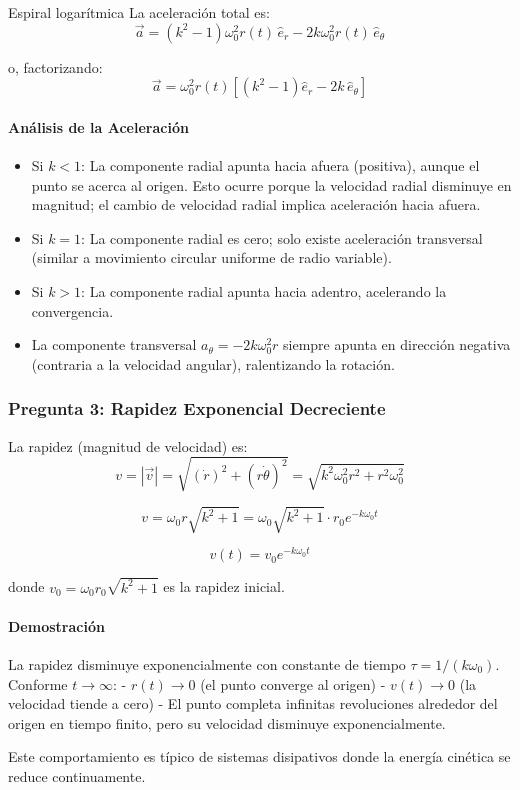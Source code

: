 \begin{solucion}{Espiral logarítmica}
La aceleración total es:
\begin{equation}
\boxed{\vec{a} = (k^2 - 1) \omega_0^2 r(t) \, \hat{e}_r - 2k\omega_0^2 r(t) \, \hat{e}_\theta}
\end{equation}

o, factorizando:
\begin{equation}
\vec{a} = \omega_0^2 r(t) \left[ (k^2 - 1) \hat{e}_r - 2k \, \hat{e}_\theta \right]
\end{equation}

\paragraph{Análisis de la Aceleración}

\begin{itemize}
    \item Si $k < 1$: La componente radial apunta hacia afuera (positiva), aunque el punto se acerca al origen. Esto ocurre porque la velocidad radial disminuye en magnitud; el cambio de velocidad radial implica aceleración hacia afuera.
    \item Si $k = 1$: La componente radial es cero; solo existe aceleración transversal (similar a movimiento circular uniforme de radio variable).
    \item Si $k > 1$: La componente radial apunta hacia adentro, acelerando la convergencia.
    \item La componente transversal $a_\theta = -2k\omega_0^2 r$ siempre apunta en dirección negativa (contraria a la velocidad angular), ralentizando la rotación.
\end{itemize}

\subsubsection*{Pregunta 3: Rapidez Exponencial Decreciente}

La rapidez (magnitud de velocidad) es:
$$v = |\vec{v}| = \sqrt{(\dot{r})^2 + (r\dot{\theta})^2} = \sqrt{k^2\omega_0^2 r^2 + r^2 \omega_0^2}$$

$$v = \omega_0 r \sqrt{k^2 + 1} = \omega_0 \sqrt{k^2 + 1} \cdot r_0 e^{-k\omega_0 t}$$

\begin{equation}
\boxed{v(t) = v_0 e^{-k\omega_0 t}}
\end{equation}

donde $v_0 = \omega_0 r_0 \sqrt{k^2 + 1}$ es la rapidez inicial.

\paragraph{Demostración}

La rapidez disminuye exponencialmente con constante de tiempo $\tau = 1/(k\omega_0)$. Conforme $t \to \infty$:
- $r(t) \to 0$ (el punto converge al origen)
- $v(t) \to 0$ (la velocidad tiende a cero)
- El punto completa infinitas revoluciones alrededor del origen en tiempo finito, pero su velocidad disminuye exponencialmente.

Este comportamiento es típico de sistemas disipativos donde la energía cinética se reduce continuamente.
\end{solucion}
